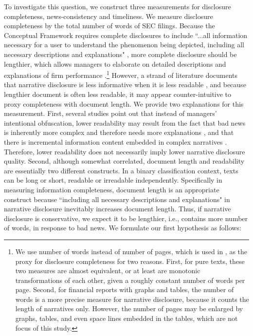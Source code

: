 \documentclass[a4paper]{article}
\begin{document}
\begin{spacing}{2}
To investigate this question, we construct three measurements for disclosure completeness, news-consistency and timeliness. We measure disclosure completeness by the total number of words of SEC filings. Because the Conceptual Framework requires complete disclosures to include ``...all information necessary for a user to understand the phenomenon being depicted, including all necessary descriptions and explanations" , more complete disclosure should be lengthier, which allows managers to elaborate on detailed descriptions and explanations of firm performance \cite{leuzDisclosureCostCapital2009}.\footnote{We use number of words instead of number of pages, which is used in , as the proxy for disclosure completeness for two reasons. First, for pure texts, these two measures are almost equivalent, or at least are monotonic transformations of each other, given a roughly constant number of words per page. Second, for financial reports with graphs and tables, the number of words is a more precise measure for narrative disclosure, because it counts the length of narratives only. However, the number of pages may be enlarged by graphs, tables, and even space lines embedded in the tables, which are not focus of this study.} However, a strand of literature documents that narrative disclosure is less informative when it is less readable , and because lengthier document is often less readable, it may appear counter-intuitive to proxy completeness with document length. We provide two explanations for this measurement. First, several studies point out that instead of managers' intentional obfuscation, lower readability may result from the fact that bad news is inherently more complex and therefore needs more explanations , and that there is incremental information content embedded in complex narratives . Therefore, lower readability does not necessarily imply lower narrative disclosure quality. Second, although somewhat correlated, document length and readability are essentially two different constructs. In a binary classification context, texts can be long or short, readable or irreadable independently. Specifically in measuring information completeness, document length is an appropriate construct because ``including all necessary descriptions and explanations"  in narrative disclosure inevitably increases document length. Thus, if narrative disclosure is conservative, we expect it to be lengthier, i.e., contains more number of words, in response to bad news. We formulate our first hypothesis as follows:


\end{spacing}
\end{document}
